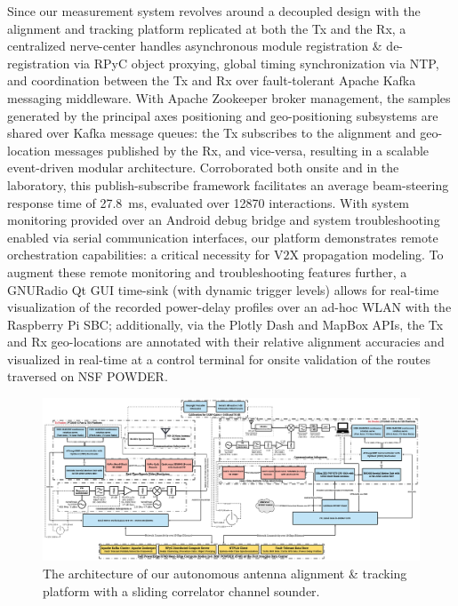 \documentclass[10pt, twocolumn]{IEEEtran}
\begin{document}
Since our measurement system revolves around a decoupled design with the alignment and tracking platform replicated at both the Tx and the Rx, a centralized nerve-center handles asynchronous module registration \& de-registration via RPyC object proxying, global timing synchronization via NTP, and coordination between the Tx and Rx over fault-tolerant Apache Kafka messaging middleware. With Apache Zookeeper broker management, the samples generated by the principal axes positioning and geo-positioning subsystems are shared over Kafka message queues: the Tx subscribes to the alignment and geo-location messages published by the Rx, and vice-versa, resulting in a scalable event-driven modular architecture. Corroborated both onsite and in the laboratory, this publish-subscribe framework facilitates an average beam-steering response time of \SI{27.8}{\milli\second}, evaluated over \SI{12870}{} interactions. With system monitoring provided over an Android debug bridge and system troubleshooting enabled via serial communication interfaces, our platform demonstrates remote orchestration capabilities: a critical necessity for V$2$X propagation modeling. To augment these remote monitoring and troubleshooting features further, a GNURadio Qt GUI time-sink (with dynamic trigger levels) allows for real-time visualization of the recorded power-delay profiles over an ad-hoc WLAN with the Raspberry Pi SBC; additionally, via the Plotly Dash and MapBox APIs, the Tx and Rx geo-locations are annotated with their relative alignment accuracies and visualized in real-time at a control terminal for onsite validation of the routes traversed on NSF POWDER.
\begin{figure} [t]
    \centering
    \includegraphics[width=1.02\textwidth]{figs/system_architecture.jpg}
    \vspace{-6mm}
    \caption{The architecture of our autonomous antenna alignment \& tracking platform with a sliding correlator channel sounder.}
    \label{F1}
    \vspace{-7mm}
\end{figure}
\vspace{-3.3mm}
\end{document}
